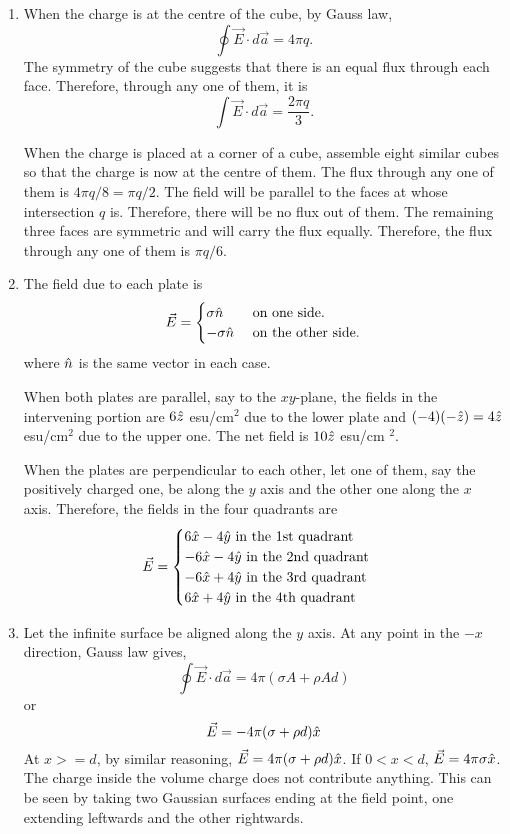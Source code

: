 \documentclass{article}
\begin{document}
\begin{enumerate}
\item When the charge is at the centre of the cube, by Gauss law,
\[
\oint\vec{E}\cdot d\vec{a} = 4\pi q.
\]
The symmetry of the cube suggests that there is an equal flux through each face.
Therefore, through any one of them, it is
\[
\int\vec{E}\cdot d\vec{a} = \frac{2\pi q}{3}.
\]

When the charge is placed at a corner of a cube, assemble eight similar cubes so
that the charge is now at the centre of them. The flux through any one of them is
$4\pi q/8 = \pi q/2$. The field will be parallel to the faces at whose intersection
$q$ is. Therefore, there will be no flux out of them. The remaining three faces
are symmetric and will carry the flux equally. Therefore, the flux through any
one of them is $\pi q/6$.

\item The field due to each plate is
\[
\vec{E} = \begin{cases}
 \sigma\hat{n} & \text{ on one side.}\\
-\sigma\hat{n} & \text{ on the other side.}
\end{cases}
\]
where $\hat{n}$ is the same vector in each case.

When both plates are parallel, say to the $xy$-plane, the fields in the intervening
portion are $6 \hat{z}$ esu/cm$^{2}$ due to the lower plate and $(-4)(-\hat{z}) = 
4\hat{z}$ esu/cm$^{2}$  due to the upper one. The net field is $10 \hat{z}$ esu/cm
$^{2}$.

When the plates are perpendicular to each other, let one of them, say the 
positively charged one, be along the $y$ axis and the other one along the $x$
axis. Therefore, the fields in the four quadrants are
\[
\vec{E} = \begin{cases}
 6\hat{x} - 4 \hat{y} \text{ in the 1st quadrant} \\
-6\hat{x} - 4 \hat{y} \text{ in the 2nd quadrant} \\
-6\hat{x} + 4 \hat{y} \text{ in the 3rd quadrant} \\
 6\hat{x} + 4 \hat{y} \text{ in the 4th quadrant}
\end{cases}
\]

\item Let the infinite surface be aligned along the $y$ axis. At any point in
the $-x$ direction, Gauss law gives,
\[
\oint\vec{E}\cdot d\vec{a} = 4\pi(\sigma A + \rho Ad)
\]
or
\[
\vec{E} = -4\pi(\sigma + \rho d)\hat{x}
\]
At $x >= d$, by similar reasoning, $\vec{E} = 4\pi(\sigma + \rho d)\hat{x}$. If
$0 < x < d$, $\vec{E} = 4\pi\sigma\hat{x}$. The charge inside the volume charge
does not contribute anything. This can be seen by taking two Gaussian surfaces
ending at the field point, one extending leftwards and the other rightwards.


\end{enumerate}
\end{document}
